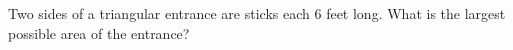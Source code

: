 Two sides of a triangular entrance are sticks each $6$ feet long. What is the largest possible area of the entrance?
